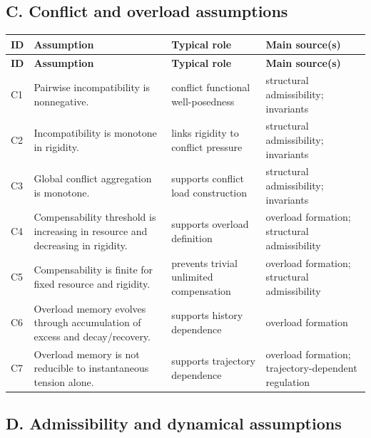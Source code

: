 \documentclass[11pt,a4paper]{article}
\begin{document}
	\subsection{C. Conflict and overload assumptions}
	
	\begin{longtable}{>{\RaggedRight\arraybackslash}p{}
			>{\RaggedRight\arraybackslash}p{}
			>{\RaggedRight\arraybackslash}p{}
			>{\RaggedRight\arraybackslash}p{}}
		\toprule
		\textbf{ID} & \textbf{Assumption} & \textbf{Typical role} & \textbf{Main source(s)} \\
		\midrule
		\endfirsthead
		\toprule
		\textbf{ID} & \textbf{Assumption} & \textbf{Typical role} & \textbf{Main source(s)} \\
		\midrule
		\endhead
		
		C1 & Pairwise incompatibility is nonnegative. & conflict functional well-posedness & structural admissibility; invariants \\
		
		C2 & Incompatibility is monotone in rigidity. & links rigidity to conflict pressure & structural admissibility; invariants \\
		
		C3 & Global conflict aggregation is monotone. & supports conflict load construction & structural admissibility; invariants \\
		
		C4 & Compensability threshold is increasing in resource and decreasing in rigidity. & supports overload definition & overload formation; structural admissibility \\
		
		C5 & Compensability is finite for fixed resource and rigidity. & prevents trivial unlimited compensation & overload formation; structural admissibility \\
		
		C6 & Overload memory evolves through accumulation of excess and decay/recovery. & supports history dependence & overload formation \\
		
		C7 & Overload memory is not reducible to instantaneous tension alone. & supports trajectory dependence & overload formation; trajectory-dependent regulation \\
		
		\bottomrule
	\end{longtable}
	
	\subsection{D. Admissibility and dynamical assumptions}
	
\end{document}
